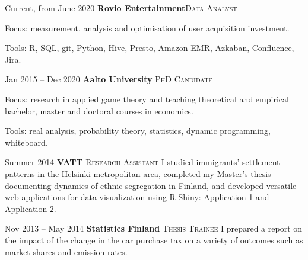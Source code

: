 \documentclass[10pt]{article} %
\begin{document}
\begin{paracol}{2}

\workposition{} %
{Current, from June 2020}
{\textbf{Rovio Entertainment}\hfill \textsc{Data Analyst}} %
 {}%
{Focus: measurement, analysis and optimisation of user acquisition investment.

Tools: R, SQL, git, Python, Hive, Presto, Amazon EMR, Azkaban, Confluence, Jira.}

\workposition{} %
{Jan 2015 -- Dec 2020}
{\textbf{Aalto University} \hfill \textsc{PhD Candidate}} %
{} %
{Focus: research in applied game theory and teaching theoretical and empirical bachelor, master and doctoral courses in economics.

Tools: real analysis, probability theory, statistics, dynamic programming, whiteboard.} %


\workposition{} %
{Summer 2014} %
{\textbf{VATT} \hfill \textsc{Research Assistant}} %
{} %
{I studied immigrants' settlement patterns in the Helsinki metropolitan area, completed my Master's thesis documenting dynamics of ethnic segregation in Finland, and developed versatile web applications  for data visualization using R Shiny: \href{https://anzhukov.shinyapps.io/Maps/}{{\color[rgb]{0,0,1} Application 1}} and \href{https://anzhukov.shinyapps.io/Diss/}{{\color[rgb]{0,0,1} Application 2}}.}  %


\workposition{} %
{Nov 2013 -- May 2014} %
{\textbf{Statistics Finland} \hfill \textsc{Thesis Trainee}} %
{} %
{I prepared a report  on the impact of the change in the car purchase tax on a variety of outcomes such as market shares and emission rates.} %







\end{paracol}
\end{document}
